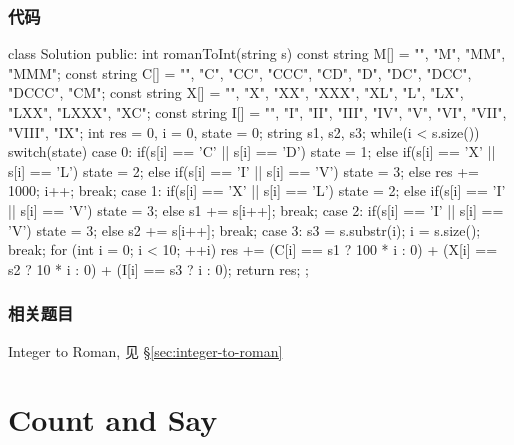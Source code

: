 \subsubsection{代码}
\begin{Code}
class Solution {
public:
    int romanToInt(string s) {
        const string M[] = {"", "M", "MM", "MMM"};
        const string C[] = {"", "C", "CC", "CCC", "CD", "D", "DC", "DCC", "DCCC", "CM"};
        const string X[] = {"", "X", "XX", "XXX", "XL", "L", "LX", "LXX", "LXXX", "XC"};
        const string I[] = {"", "I", "II", "III", "IV", "V", "VI", "VII", "VIII", "IX"};
        int res = 0, i = 0, state = 0;
        string s1, s2, s3;
        while(i < s.size()) {
            switch(state) {
            case 0:
                if(s[i] == 'C' || s[i] == 'D') {
                    state = 1;
                } else if(s[i] == 'X' || s[i] == 'L') {
                    state = 2;
                } else if(s[i] == 'I' || s[i] == 'V') {
                    state = 3;
                } else {
                    res += 1000;
                    i++;
                }
                break;
            case 1:
                if(s[i] == 'X' || s[i] == 'L') {
                    state = 2;
                } else if(s[i] == 'I' || s[i] == 'V') {
                    state = 3;
                } else {
                    s1 += s[i++];
                }
                break;
            case 2:
                if(s[i] == 'I' || s[i] == 'V') {
                    state = 3;
                } else {
                    s2 += s[i++];
                }
                break;
            case 3:
                s3 = s.substr(i);
                i = s.size();
                break;
            }
        }
        for (int i = 0; i < 10; ++i) {
            res += (C[i] == s1 ? 100 * i : 0)
                   + (X[i] == s2 ? 10 * i : 0)
                   + (I[i] == s3 ? i : 0);
        }
        return res;
    }
};
\end{Code}

\subsubsection{相关题目}
\begindot
\item Integer to Roman, 见 \S \ref{sec:integer-to-roman}
\myenddot


\section{Count and Say} %
\label{sec:count-and-say}


